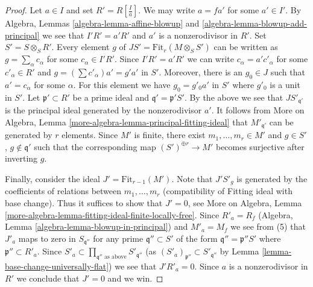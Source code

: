 \documentclass[10pt,a4paper]{amsart}
\theoremstyle{plain}
\theoremstyle{definition}
\theoremstyle{remark}
\numberwithin{equation}{subsection}
\begin{document}
\begin{proof}
\medskip\noindent
Let $a \in I$ and set $R' = R[\frac{I}{a}]$. We may write $a = fa'$
for some $a' \in I'$. By Algebra, Lemmas \ref{algebra-lemma-affine-blowup} and
\ref{algebra-lemma-blowup-add-principal} we see that $I' R' = a'R'$
and $a'$ is a nonzerodivisor in $R'$. Set $S' = S \otimes_S R'$.
Every element $g$ of $JS' = \text{Fit}_r(M \otimes_S S')$ can be
written as $g = \sum_\alpha c_\alpha$ for some $c_\alpha \in I'R'$.
Since $I'R' = a'R'$ we can write $c_\alpha = a'c'_\alpha$ for some
$c'_\alpha \in R'$ and $g = (\sum c'_\alpha)a' = g' a'$ in $S'$.
Moreover, there is an $g_0 \in J$ such that $a' = c_\alpha$
for some $\alpha$. For this element we have $g_0 = g'_0 a'$ in $S'$
where $g'_0$ is a unit in $S'$.
Let $\mathfrak p' \subset R'$ be
a prime ideal and $\mathfrak q' = \mathfrak p'S'$.
By the above we see that $JS'_{\mathfrak q'}$ is the
principal ideal generated by the nonzerodivisor $a'$.
It follows from More on Algebra, Lemma
\ref{more-algebra-lemma-principal-fitting-ideal}
that $M'_{\mathfrak q'}$ can be generated by $r$ elements.
Since $M'$ is finite, there exist $m_1, \ldots, m_r \in M'$ and
$g \in S'$, $g \not \in \mathfrak q'$ such that the corresponding map
$(S')^{\oplus r} \to M'$ becomes surjective after inverting $g$.

\medskip\noindent
Finally, consider the ideal $J' = \text{Fit}_{r - 1}(M')$.
Note that $J'S'_g$ is generated by the coefficients of relations between
$m_1, \ldots, m_r$ (compatibility of Fitting ideal with base change).
Thus it suffices to show that $J' = 0$, see
More on Algebra, Lemma
\ref{more-algebra-lemma-fitting-ideal-finite-locally-free}.
Since $R'_a = R_f$ (Algebra, Lemma \ref{algebra-lemma-blowup-in-principal})
and $M'_a = M_f$ we see from (5)
that $J'_a$ maps to zero in $S_{\mathfrak q''}$ for any prime
$\mathfrak q'' \subset S'$ of the form $\mathfrak q'' = \mathfrak p''S'$
where $\mathfrak p'' \subset R'_a$. Since
$S'_a \subset \prod_{\mathfrak q''\text{ as above}} S'_{\mathfrak q''}$
(as $(S'_a)_{\mathfrak p''} \subset S'_{\mathfrak q''}$ by
Lemma \ref{lemma-base-change-universally-flat})
we see that $J'R'_a = 0$. Since $a$ is a nonzerodivisor in $R'$ we
conclude that $J' = 0$ and we win.
\end{proof}
\end{document}
